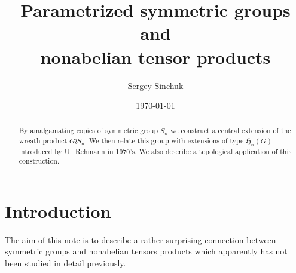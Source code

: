 \documentclass[oneside, 10pt]{amsart}
\title[Parametrized symmetric groups]{Parametrized symmetric groups and \\ nonabelian tensor products}
\author {Sergey Sinchuk}
\date {\today}
\theoremstyle{plain}
\numberwithin{equation}{section}
\numberwithin{lemma}{section}
\theoremstyle{remark}
\theoremstyle{definition}
\begin{document}
\begin{abstract} By amalgamating copies of symmetric group $S_n$ we construct a central extension of the wreath product $G \wr S_n$.
We then relate this group with extensions of type $\mathfrak{H}_n(G)$ introduced by U.~Rehmann in 1970's. 
We also describe a topological application of this construction.
\end{abstract}

\maketitle

\section{Introduction}
The aim of this note is to describe a rather surprising connection between symmetric groups and nonabelian tensors products 
 which apparently has not been studied in detail previously.
\end{document}
